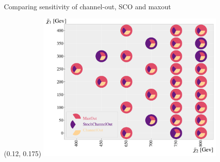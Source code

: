 \documentclass[UKenglish]{beamer}
\begin{document}
\begin{frame}{Comparing sensitivity of channel-out, SCO and maxout}
    \begin{textblock}{1}(0.12, 0.175)
    \includegraphics[width = 0.7\textwidth]{figures/Comps/EnsemblesNetworkComp.pdf}
    \end{textblock}
\end{frame}

\end{document}

